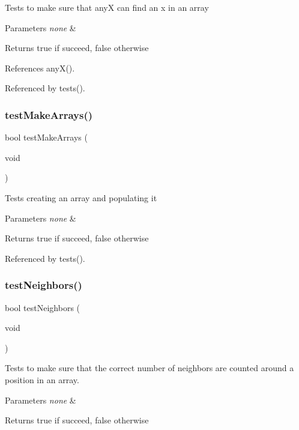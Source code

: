 Tests to make sure that anyX can find an x in an array 
\begin{DoxyParams}{Parameters}
{\em none} & \\
\hline
\end{DoxyParams}
\begin{DoxyReturn}{Returns}
true if succeed, false otherwise 
\end{DoxyReturn}


References any\+X().



Referenced by tests().

\mbox{\label{tests_8c_af6e338851f3ccb4714e1bfb06ec4b428}} 
\subsubsection{test\+Make\+Arrays()}
{\footnotesize\ttfamily bool test\+Make\+Arrays (\begin{DoxyParamCaption}\item[{void}]{ }\end{DoxyParamCaption})}

Tests creating an array and populating it 
\begin{DoxyParams}{Parameters}
{\em none} & \\
\hline
\end{DoxyParams}
\begin{DoxyReturn}{Returns}
true if succeed, false otherwise 
\end{DoxyReturn}


Referenced by tests().

\mbox{\label{tests_8c_a3809ae80cb3300c9a6d248b7db6a1a99}} 
\subsubsection{test\+Neighbors()}
{\footnotesize\ttfamily bool test\+Neighbors (\begin{DoxyParamCaption}\item[{void}]{ }\end{DoxyParamCaption})}

Tests to make sure that the correct number of neighbors are counted around a position in an array. 
\begin{DoxyParams}{Parameters}
{\em none} & \\
\hline
\end{DoxyParams}
\begin{DoxyReturn}{Returns}
true if succeed, false otherwise 
\end{DoxyReturn}


